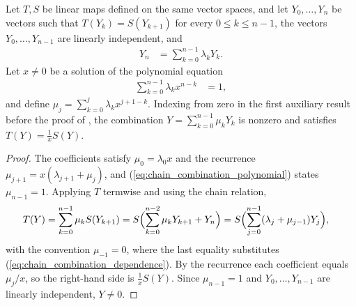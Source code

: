 \begin{lemma}
    \label{lem:pgvwc07_chain_combination}
    \leanok
    Let $T,S$ be linear maps defined on the same vector spaces, and let
    $Y_0,\ldots,Y_n$ be vectors such that $T(Y_k)=S(Y_{k+1})$ for every
    $0\le k\le n-1$, the vectors $Y_0,\ldots,Y_{n-1}$ are linearly
    independent, and
    \begin{align}
        Y_n & = \sum_{k=0}^{n-1}\lambda_k Y_k.
        \label{eq:chain_combination_dependence}
    \end{align}
    Let $x\neq0$ be a solution of the polynomial equation
    \begin{align}
        \sum_{k=0}^{n-1}\lambda_k x^{n-k} & = 1,
        \label{eq:chain_combination_polynomial}
    \end{align}
    and define $\mu_j=\sum_{k=0}^{j}\lambda_k x^{j+1-k}$. Indexing from zero in the first auxiliary result before the proof
    of \cite[Theorem~7]{PerezGarcia2007Matrix}, the
    combination $Y=\sum_{k=0}^{n-1}\mu_k Y_k$ is nonzero and satisfies
    $T(Y)=\tfrac1x S(Y)$.
\end{lemma}

\begin{proof}
    \leanok
    The coefficients satisfy $\mu_0=\lambda_0 x$ and the recurrence
    $\mu_{j+1}=x(\lambda_{j+1}+\mu_j)$, and
    (\ref{eq:chain_combination_polynomial}) states $\mu_{n-1}=1$. Applying
    $T$ termwise and using the chain relation,
    \begin{align}
        T(Y)
         & =\sum_{k=0}^{n-1}\mu_k S(Y_{k+1})
        =S\Bigl(\sum_{k=0}^{n-2}\mu_k Y_{k+1}+Y_n\Bigr)
        =S\Bigl(\sum_{j=0}^{n-1}(\lambda_j+\mu_{j-1})Y_j\Bigr),
        \label{eq:chain_combination_reindex}
    \end{align}
    with the convention $\mu_{-1}=0$, where the last equality substitutes
    (\ref{eq:chain_combination_dependence}). By the recurrence each
    coefficient equals $\mu_j/x$, so the right-hand side is
    $\tfrac1x S(Y)$. Since $\mu_{n-1}=1$ and $Y_0,\ldots,Y_{n-1}$ are
    linearly independent, $Y\neq0$.
\end{proof}

